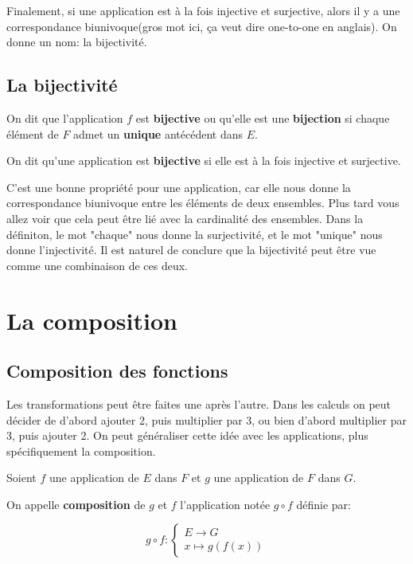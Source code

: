 \documentclass{article}
\begin{document}
Finalement, si une application est à la fois injective et surjective, alors il y a une correspondance biunivoque(gros mot ici, \c ca veut dire one-to-one en anglais). On donne un nom: la bijectivité.




\subsection{La bijectivité}

\begin{tcolorbox}[colback=red!5!white,colframe=red!75!black,title=Définition 3.5]

On dit que l'application $f$ est \textbf{bijective} ou qu'elle est une \textbf{bijection} si chaque élément de $F$ admet un \textbf{unique} antécédent dans $E$.

\tcblower

On dit qu'une application est \textbf{bijective} si elle est à la fois injective et surjective.
\end{tcolorbox}

C'est une bonne propriété pour une application, car elle nous donne la correspondance biunivoque entre les éléments de deux ensembles. Plus tard vous allez voir que cela peut être lié avec la cardinalité des ensembles. Dans la définiton, le mot "chaque" nous donne la surjectivité, et le mot "unique" nous donne l'injectivité. Il est naturel de conclure que la bijectivité peut être vue comme une combinaison de ces deux.





\section{La composition}
\subsection{Composition des fonctions}
Les transformations peut être faites une après l'autre. Dans les calculs on peut décider de d'abord ajouter 2, puis multiplier par 3, ou bien d'abord multiplier par 3, puis ajouter 2. On peut généraliser cette idée avec les applications, plus spécifiquement la composition.

\begin{tcolorbox}[colback=red!5!white,colframe=red!75!black,title=Définition 3.6]

Soient $f$ une application de $E$ dans $F$ et $g$ une application de $F$ dans $G$.

On appelle \textbf{composition} de $g$ et $f$ l'application notée $g \circ f$ définie par:

\[ g \circ f :
\begin{cases}
E \to G \\ 
x \mapsto g(f(x))
\end{cases}
\]

\end{tcolorbox}
\end{document}
